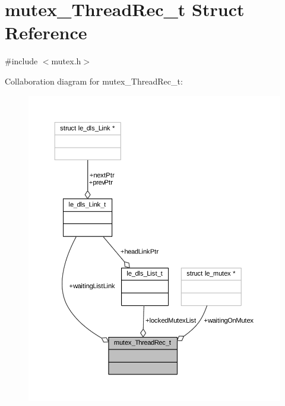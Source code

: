 \hypertarget{structmutex___thread_rec__t}{}\section{mutex\+\_\+\+Thread\+Rec\+\_\+t Struct Reference}
\label{structmutex___thread_rec__t}


{\ttfamily \#include $<$mutex.\+h$>$}



Collaboration diagram for mutex\+\_\+\+Thread\+Rec\+\_\+t\+:
\nopagebreak
\begin{figure}[H]
\begin{center}
\leavevmode
\includegraphics[width=350pt]{structmutex___thread_rec__t__coll__graph}
\end{center}
\end{figure}
